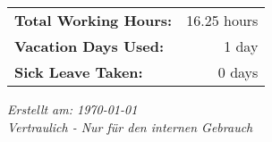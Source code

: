 \documentclass[11pt]{article}
\begin{document}
\begin{center}
\begin{tabular}{lr}
    \textbf{Total Working Hours:} & 16.25 hours \\
    \textbf{Vacation Days Used:} & 1 day \\
    \textbf{Sick Leave Taken:} & 0 days \\[0.5cm]
\end{tabular}
\end{center}

\vspace{1cm}

\noindent
\begin{flushleft}
    \small
    \textit{Erstellt am: \today} \\
    \textit{Vertraulich - Nur für den internen Gebrauch}
\end{flushleft}
\end{document}

